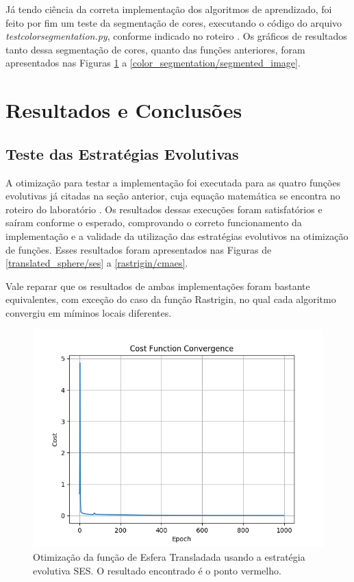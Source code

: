 \documentclass[conference]{IEEEtran}
\begin{document}
Já tendo ciência da correta implementação dos algoritmos de aprendizado, foi feito por fim um teste da segmentação de cores, executando o código do arquivo \textit{test\underline{\space}color\underline{\space}segmentation.py}, conforme indicado no roteiro \cite{roteiro}. Os gráficos de resultados tanto dessa segmentação de cores, quanto das funções anteriores, foram apresentados nas Figuras \ref{sum_gt_zero/cost_function_convergence} a \ref{color_segmentation/segmented_image}.

\section{Resultados e Conclusões}

\subsection{Teste das Estratégias Evolutivas}

A otimização para testar a implementação foi executada para as quatro funções evolutivas já citadas na seção anterior, cuja equação matemática se encontra no roteiro do laboratório \cite{b1}. Os resultados dessas execuções foram satisfatórios e saíram conforme o esperado, comprovando o correto funcionamento da implementação e a validade da utilização das estratégias evolutivos na otimização de funções. Esses resultados foram apresentados nas Figuras de \ref{translated_sphere/ses} a \ref{rastrigin/cmaes}.

Vale reparar que os resultados de ambas implementações foram bastante equivalentes, com exceção do caso da função Rastrigin, no qual cada algoritmo convergiu em míminos locais diferentes.

\begin{figure}[htbp]
\centering
\centerline{\includegraphics[scale=0.5]{imagens/sum_gt_zero/cost_function_convergence.png}}
\caption{Otimização da função de Esfera Transladada usando a estratégia evolutiva SES. O resultado encontrado é o ponto vermelho.}
\label{sum_gt_zero/cost_function_convergence}
\end{figure}
\end{document}
